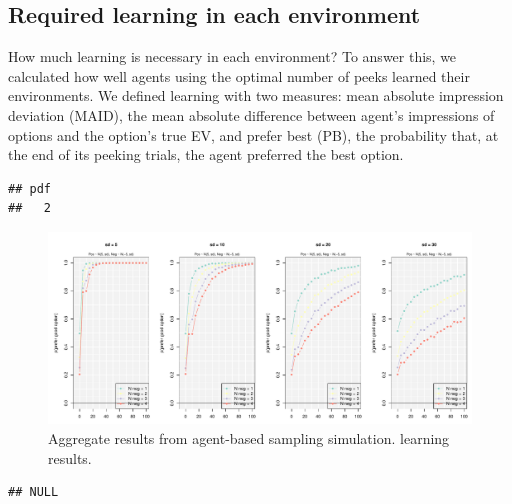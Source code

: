\documentclass[a4paper,doc,natbib,floatsintext]{apa6}\usepackage[]{graphicx}\usepackage[]{color}
\makeatletter
\newenvironment{kframe}{%
 \def\at@end@of@kframe{}%
 \ifinner\ifhmode%
  \def\at@end@of@kframe{\end{minipage}}%
  \begin{minipage}{\columnwidth}%
 \fi\fi%
 \def\FrameCommand##1{\hskip\@totalleftmargin \hskip-\fboxsep
 \colorbox{shadecolor}{##1}\hskip-\fboxsep
     \hskip-\linewidth \hskip-\@totalleftmargin \hskip\columnwidth}%
 \MakeFramed {\advance\hsize-\width
   \@totalleftmargin\z@ \linewidth\hsize
   \@setminipage}}%
 {\par\unskip\endMakeFramed%
 \at@end@of@kframe}
\newenvironment{knitrout}{}{} %
\makeatother
\begin{document}
\subsection{Required learning in each environment}

How much learning is necessary in each environment? To answer this, we calculated how well agents using the optimal number of peeks learned their environments. We defined learning with two measures: mean absolute impression deviation (MAID), the mean absolute difference between agent's impressions of options and the option's true EV, and prefer best (PB), the probability that, at the end of its peeking trials, the agent preferred the best option. 






\begin{knitrout}
\color{fgcolor}\begin{kframe}
\begin{verbatim}
## pdf 
##   2
\end{verbatim}
\end{kframe}
\end{knitrout}





\begin{figure}
\centering
\includegraphics[width=6in]{figures/optimal_result_learning.pdf}
\caption{\label{fig:learning}Aggregate results from agent-based sampling simulation. learning results.}
\end{figure}








\begin{knitrout}
\color{fgcolor}\begin{kframe}
\begin{verbatim}
## NULL
\end{verbatim}
\end{kframe}
\end{knitrout}
\end{document}
